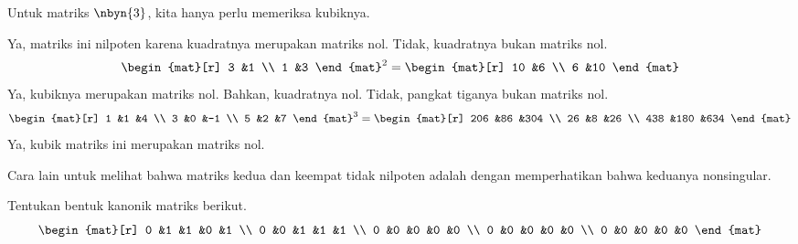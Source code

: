 \begin{exercises}
\begin{answer}
      Untuk matriks $\nbyn{3}$, kita hanya perlu memeriksa kubiknya.
      \begin{exparts}
        \partsitem Ya, matriks ini nilpoten karena
          kuadratnya merupakan matriks nol.
        \partsitem Tidak, kuadratnya bukan matriks nol.
          \begin{equation*}
            \begin{mat}[r]
               3  &1  \\
               1  &3
            \end{mat}^2
            =\begin{mat}[r]
               10  &6  \\
               6   &10
            \end{mat}
          \end{equation*}
        \partsitem Ya, kubiknya merupakan matriks nol.
          Bahkan, kuadratnya nol.
        \partsitem Tidak, pangkat tiganya bukan matriks nol.
          \begin{equation*}
            \begin{mat}[r]
              1  &1  &4  \\
              3  &0  &-1 \\
              5  &2  &7
            \end{mat}^3
            =\begin{mat}[r]
              206  &86  &304  \\
               26  &8   &26   \\
              438  &180 &634
            \end{mat}
          \end{equation*}
        \partsitem Ya, kubik matriks ini merupakan matriks nol.
      \end{exparts}
      Cara lain untuk melihat bahwa matriks kedua dan keempat tidak nilpoten
      adalah dengan memperhatikan bahwa keduanya nonsingular.
    \end{answer}
  \recommended \item 
    Tentukan bentuk kanonik matriks berikut.
    \begin{equation*}
      \begin{mat}[r]
        0  &1  &1  &0  &1  \\
        0  &0  &1  &1  &1  \\
        0  &0  &0  &0  &0  \\
        0  &0  &0  &0  &0  \\
        0  &0  &0  &0  &0
      \end{mat}

\end{equation*}
\end{exercises}
